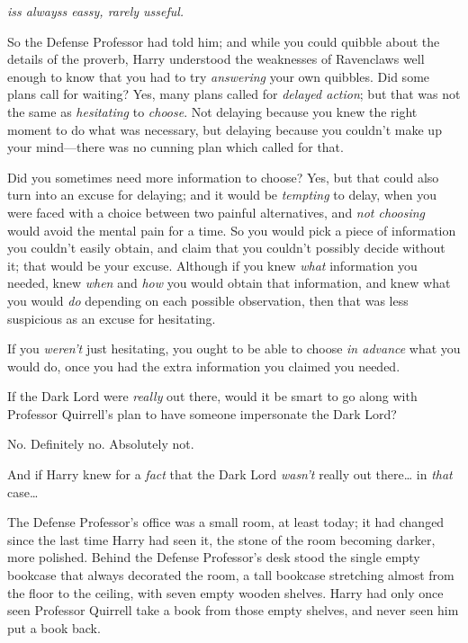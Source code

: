 
\emph{iss alwayss eassy, rarely usseful.}

\quad
So the Defense Professor had told him; and while you could quibble about the 
details of the proverb, Harry understood the weaknesses of Ravenclaws well 
enough to know that you had to try \emph{answering} your own quibbles. Did some 
plans call for waiting? Yes, many plans called for \emph{delayed action}; but 
that was not the same as \emph{hesitating} to \emph{choose}. Not delaying 
because you knew the right moment to do what was necessary, but delaying 
because you couldn't make up your mind---there was no cunning plan which called 
for that.

Did you sometimes need more information to choose? Yes, but that could also 
turn into an excuse for delaying; and it would be \emph{tempting} to delay, 
when you were faced with a choice between two painful alternatives, and 
\emph{not choosing} would avoid the mental pain for a time. So you would pick a 
piece of information you couldn't easily obtain, and claim that you couldn't 
possibly decide without it; that would be your excuse. Although if you knew 
\emph{what} information you needed, knew \emph{when} and \emph{how} you would 
obtain that information, and knew what you would \emph{do} depending on each 
possible observation, then that was less suspicious as an excuse for hesitating.

If you \emph{weren't} just hesitating, you ought to be able to choose \emph{in 
advance} what you would do, once you had the extra information you claimed you 
needed.

If the Dark Lord were \emph{really} out there, would it be smart to go along 
with Professor Quirrell's plan to have someone impersonate the Dark Lord?

No. Definitely no. Absolutely not.

And if Harry knew for a \emph{fact} that the Dark Lord \emph{wasn't} really out 
there{\ldots} in \emph{that} case{\ldots}

The Defense Professor's office was a small room, at least today; it had changed 
since the last time Harry had seen it, the stone of the room becoming darker, 
more polished. Behind the Defense Professor's desk stood the single empty 
bookcase that always decorated the room, a tall bookcase stretching almost from 
the floor to the ceiling, with seven empty wooden shelves. Harry had only once 
seen Professor Quirrell take a book from those empty shelves, and never seen 
him put a book back.

